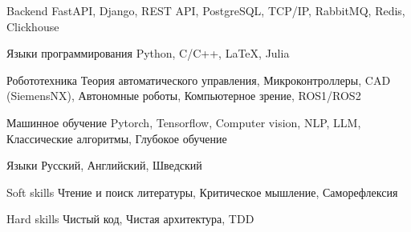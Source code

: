 

\begin{cvskills}

  \cvskill
    {Backend} %
    {FastAPI, Django, REST API, PostgreSQL, TCP/IP, RabbitMQ, Redis, Clickhouse} %

  \cvskill
    {Языки программирования} %
    {Python, C/C++, LaTeX, Julia} %

  \cvskill
    {Робототехника} %
    {Теория автоматического управления, Микроконтроллеры, CAD (SiemensNX), } %
  \cvskill
    {} %
    {Автономные роботы, Компьютерное зрение, ROS1/ROS2} %

  \cvskill
    {Машинное обучение}
    {Pytorch, Tensorflow, Computer vision, NLP, LLM, Классические алгоритмы, Глубокое обучение}

  \cvskill
    {Языки} %
    {Русский, Английский, Шведский} %

  \cvskill
    {Soft skills} %
    {Чтение и поиск литературы, Критическое мышление, Саморефлексия} %

  \cvskill
    {Hard skills} %
    {Чистый код, Чистая архитектура, TDD} %

\end{cvskills}

